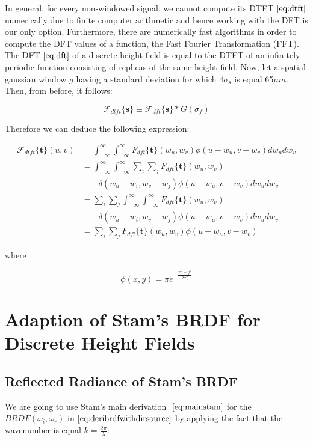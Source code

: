 In general, for every non-windowed signal, we cannot compute its DTFT $\ref{eq:dtft}$ numerically due to finite computer arithmetic and hence working with the DFT is our only option. Furthermore, there are numerically fast algorithms in order to compute the DFT values of a function, the Fast Fourier Transformation (FFT). The DFT $\ref{eq:dft}$ of a discrete height field is equal to the DTFT of an infinitely periodic function consisting of replicas of the same height field. Now, let a spatial gaussian window $g$ having a standard deviation for which $4\sigma_s$ is equal 65$\mu m$. Then, from before, it follows:

\begin{equation}
\mathcal{F}_{dtft}\{\mathbf{s}\} \equiv \mathcal{F}_{dft} \{\mathbf{s}\} * G(\sigma_f)
\end{equation} 

Therefore we can deduce the following expression:

\begin{align}
\mathcal{F}_{dtft} \{\mathbf{t}\}(u,v)
& = \int_{-\infty}^{\infty} \int_{-\infty}^{\infty} {F}_{dft}\{\mathbf{t}\}(w_u,w_v) \phi(u-w_u, v-w_v) dw_u dw_v \nonumber \\
& = \int_{-\infty}^{\infty} \int_{-\infty}^{\infty} \sum_i \sum_j {F}_{dft} \{\mathbf{t}\}(w_u,w_v) \nonumber \\ 
& \quad \quad \delta(w_u-w_i, w_v-w_j)\phi(u-w_u, v-w_v) dw_u dw_v \nonumber \\
& = \sum_i \sum_j \int_{-\infty}^{\infty} \int_{-\infty}^{\infty}  {F}_{dft} \{\mathbf{t}\}(w_u,w_v) \nonumber \\
& \quad \quad \delta(w_u-w_i, w_v-w_j)\phi(u-w_u, v-w_v) dw_u dw_v \nonumber \\
& = \sum_i \sum_j {F}_{dft} \{\mathbf{t}\}(w_u,w_v) \phi(u-w_u, v-w_v)
\end{align}

where 

\begin{equation} 
 \phi(x,y) = \pi e^{-\frac{x^2 + y^2}{2\sigma_{f}^2}}
  \label{eq:gaussweight}
\end{equation} 

\section{Adaption of Stam's BRDF for Discrete Height Fields}

\subsection{Reflected Radiance of Stam's BRDF}
We are going to use Stam's main derivation $~\eqref{eq:mainstam}$ for the $BRDF(\omega_i, \omega_r)$ in $\ref{eq:deribrdfwithdirsource}$ by applying the fact that the wavenumber is equal $k=\frac{2\pi}{\lambda}$:

